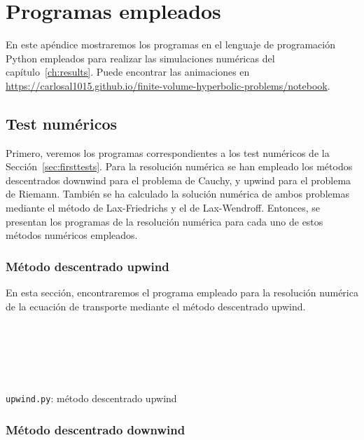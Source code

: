 \chapter{Programas empleados}\label{app:programs}

En este apéndice mostraremos los programas en el lenguaje de
programación Python empleados para realizar las simulaciones
numéricas del capítulo~\ref{ch:results}.
Puede encontrar las animaciones en
\url{https://carlosal1015.github.io/finite-volume-hyperbolic-problems/notebook}.

\section{Test numéricos}

Primero, veremos los programas correspondientes a los test numéricos
de la Sección~\ref{sec:firsttests}.
Para la resolución numérica se han empleado los métodos descentrados
downwind para el problema de Cauchy, y upwind para el problema de
Riemann.
También se ha calculado la solución numérica de ambos problemas
mediante el método de Lax-Friedrichs y el de Lax-Wendroff.
Entonces, se presentan los programas de la resolución numérica
para cada uno de estos métodos numéricos empleados.

\clearpage
\subsection{Método descentrado upwind}

En esta sección, encontraremos el programa empleado para la
resolución numérica de la ecuación de transporte mediante el método
descentrado upwind.

\begin{listing}[ht!]
    \tiny
    \centering
    \inputminted[firstline=1,lastline=2]{python}{upwind.py}
    \inputminted[firstline=4,lastline=7]{python}{upwind.py}
    \inputminted[firstline=10,lastline=11]{python}{upwind.py}
    \inputminted[firstline=14,lastline=33]{python}{upwind.py}
    \inputminted[firstline=35,lastline=35]{python}{upwind.py}
    \inputminted[firstline=38,lastline=42]{python}{upwind.py}
    \inputminted[firstline=45,lastline=53]{python}{upwind.py}
    \caption{\texttt{upwind.py}: método descentrado upwind}
\end{listing}

\clearpage
\subsection{Método descentrado downwind}

